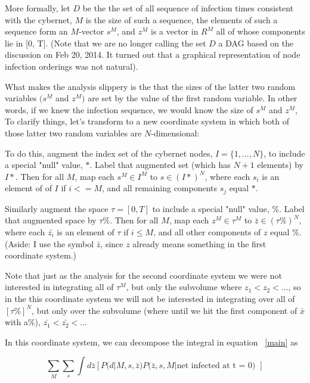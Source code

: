 \documentclass{article}
\begin{document}
    More formally, let $D$ be the the set of all sequence of infection times consistent with 
    the cybernet, $M$ is the size of such a sequence, the elements of such a sequence form an 
    $M$-vector $s^M$, and $z^M$ is a vector in $R^M$ all of whose components lie in 
    [0, T]. (Note that we are no longer calling the set $D$ a DAG based on the discussion on
    Feb 20, 2014. It turned out that a graphical representation of node infection orderings
    was not natural).

    What makes the analysis slippery is the that the sizes of the latter
    two random variables $(s^M$ and $z^M)$ are set by the value of the
    first random variable. In other words, if we knew the infection sequence, we would know 
    the size of $s^M$ and $z^M$,  To clarify things, let's transform to a new coordinate system 
    in which both of those latter two random variables are $N$-dimensional:

    To do this, augment the index set of the cybernet nodes, $I = \{1, ..., N\}$, to include a special "null"
    value, $*$. Label that augmented set (which has $N+1$ elements) by $I*$.
    Then for all $M$, map each $s^M \in I^M$ to $s \in (I*)^N$, where each $s_i$ is an element of
    of $I$ if $i <= M$, and all remaining components $s_j$ equal $*$.

    Similarly augment the space $\tau = [0, T]$ to include a special "null" value, $\%$.
    Label that augmented space by $\tau\%$. Then for all $M$, map each $z^M \in \tau^M$ to
    $\bar{z} \in (\tau\%)^N$, where each $\bar{z_i}$ is an element of $\tau$ if $i \leq M$, and all other
    components of $z$ equal $\%$. (Aside: I use the symbol $\bar{z}$, since $z$ already means
    something in the first coordinate system.)

    Note that just as the analysis for the second coordinate system we were not interested in integrating
    all of $\tau^M$, but only the subvolume where $z_1 < z_2 < ...$, so in the this coordinate system
    we will not be interested in integrating over all of $[\tau\%]^N$, but only over the subvolume
    (where until we hit the first component of $\bar{x}$ with a$\%$), $\bar{z_1} < \bar{z_2} < ...$

    In this coordinate system, we can decompose the integral in equation ~\ref{main} as

\begin{equation}
\sum_{M}  \sum_{s}  \int d\bar{z}  [P(d | M, s, \bar{z})  P(\bar{z}, s, M | \text{net infected at t = 0) }]
\end{equation}
\end{document}

